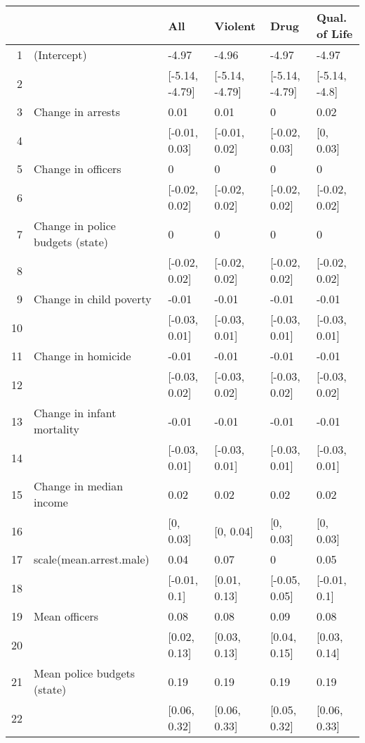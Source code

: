 \begin{table}[ht]
\centering
\begin{tabular}{rlllll}
  \hline
 &   & All & Violent & Drug & Qual. of Life \\ 
  \hline
1 & (Intercept) & -4.97 & -4.96 & -4.97 & -4.97 \\ 
  2 &  & [-5.14, -4.79] & [-5.14, -4.79] & [-5.14, -4.79] & [-5.14, -4.8] \\ 
  3 & Change in arrests & 0.01 & 0.01 & 0 & 0.02 \\ 
  4 &  & [-0.01, 0.03] & [-0.01, 0.02] & [-0.02, 0.03] & [0, 0.03] \\ 
  5 & Change in officers & 0 & 0 & 0 & 0 \\ 
  6 &  & [-0.02, 0.02] & [-0.02, 0.02] & [-0.02, 0.02] & [-0.02, 0.02] \\ 
  7 & Change in police budgets (state) & 0 & 0 & 0 & 0 \\ 
  8 &  & [-0.02, 0.02] & [-0.02, 0.02] & [-0.02, 0.02] & [-0.02, 0.02] \\ 
  9 & Change in child poverty & -0.01 & -0.01 & -0.01 & -0.01 \\ 
  10 &  & [-0.03, 0.01] & [-0.03, 0.01] & [-0.03, 0.01] & [-0.03, 0.01] \\ 
  11 & Change in homicide & -0.01 & -0.01 & -0.01 & -0.01 \\ 
  12 &  & [-0.03, 0.02] & [-0.03, 0.02] & [-0.03, 0.02] & [-0.03, 0.02] \\ 
  13 & Change in infant mortality & -0.01 & -0.01 & -0.01 & -0.01 \\ 
  14 &  & [-0.03, 0.01] & [-0.03, 0.01] & [-0.03, 0.01] & [-0.03, 0.01] \\ 
  15 & Change in median income & 0.02 & 0.02 & 0.02 & 0.02 \\ 
  16 &  & [0, 0.03] & [0, 0.04] & [0, 0.03] & [0, 0.03] \\ 
  17 & scale(mean.arrest.male) & 0.04 & 0.07 & 0 & 0.05 \\ 
  18 &  & [-0.01, 0.1] & [0.01, 0.13] & [-0.05, 0.05] & [-0.01, 0.1] \\ 
  19 & Mean officers & 0.08 & 0.08 & 0.09 & 0.08 \\ 
  20 &  & [0.02, 0.13] & [0.03, 0.13] & [0.04, 0.15] & [0.03, 0.14] \\ 
  21 & Mean police budgets (state) & 0.19 & 0.19 & 0.19 & 0.19 \\ 
  22 &  & [0.06, 0.32] & [0.06, 0.33] & [0.05, 0.32] & [0.06, 0.33] \\ 

\end{tabular}
\end{table}
